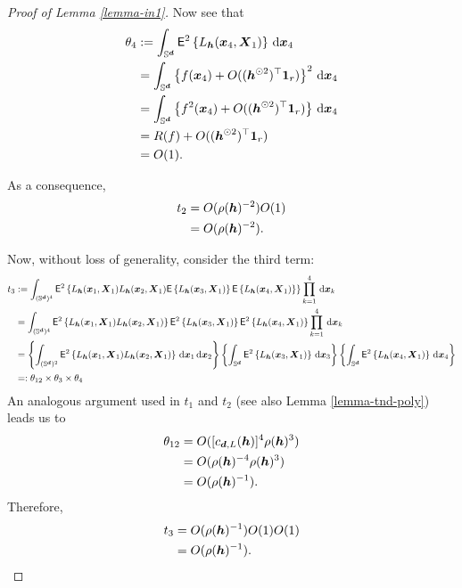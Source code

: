 \documentclass[oneside,11pt]{article}
\begin{document}
\begin{proof}[Proof of Lemma \ref{lemma-in1}]
Now see that
\begin{align*}
    \theta_4 & \defin \int_{\Sr} \mathsf{E}^2 \lrb{ L_{\bh} (\bx_4,\bX_1)} \,\rd \bx_4 \\
    &= \int_{\Sr} \lrb{f(\bx_4)+O((\bh^{\odot 2 })^{\top} \mathbf{1}_r)}^{2} \,\rd \bx_4 \\
    &= \int_{\Sr} \lrb{f^2(\bx_4)+O((\bh^{\odot 2 })^{\top} \mathbf{1}_r)} \,\rd \bx_4 \\
    &= R(f) + O((\bh^{\odot 2 })^{\top} \mathbf{1}_r) \\
    &= O(1).
\end{align*}

As a consequence,
\begin{align*}
    t_2 &= O(\rho (\bh)^{-2})O(1) \\
    &= O(\rho (\bh)^{-2}).
\end{align*}

Now, without loss of generality, consider the third term:
\begin{align*}
    t_3 &\defin \int_{(\Sr)^4} \mathsf{E}^2 \lrb{ L_{\bh} (\bx_1,\bX_1) L_{\bh} (\bx_2,\bX_1) \mathsf{E} \lrb{ L_{\bh} (\bx_3,\bX_1)} \mathsf{E} \lrb{ L_{\bh} (\bx_4,\bX_1)} }\prod_{k=1}^{4} \,\rd \bx_k \\
    &= \int_{(\Sr)^4} \mathsf{E}^2 \lrb{ L_{\bh} (\bx_1,\bX_1) L_{\bh} (\bx_2,\bX_1) } \mathsf{E}^2 \lrb{ L_{\bh} (\bx_3,\bX_1)} \mathsf{E}^2 \lrb{ L_{\bh} (\bx_4,\bX_1)} \prod_{k=1}^{4} \,\rd \bx_k \\
    &= \lrb{\int_{(\Sr)^2} \mathsf{E}^2 \lrb{ L_{\bh} (\bx_1,\bX_1) L_{\bh} (\bx_2,\bX_1) } \,\rd \bx_1 \,\rd \bx_2} \lrb{\int_{\Sr} \mathsf{E}^2 \lrb{ L_{\bh} (\bx_3,\bX_1)} \,\rd \bx_3} \lrb{\int_{\Sr} \mathsf{E}^2 \lrb{ L_{\bh} (\bx_4,\bX_1)} \,\rd \bx_4} \\
    &\indef \theta_{12} \times \theta_3 \times \theta_4
\end{align*}
An analogous argument used in $t_1$ and $t_2$ (see also Lemma \ref{lemma-tnd-poly}) leads us to 
\begin{align*}
    \theta_{12} &= O([c_{\bd,L}(\bh)]^4 \rho (\bh)^3) \\
    &= O(\rho (\bh)^{-4} \rho (\bh)^3) \\
    &= O(\rho (\bh)^{-1}).
\end{align*}
Therefore,
\begin{align*}
    t_3 &= O(\rho (\bh)^{-1})O(1)O(1) \\
    &= O(\rho(\bh)^{-1}).
\end{align*}


\end{proof}
\end{document}
